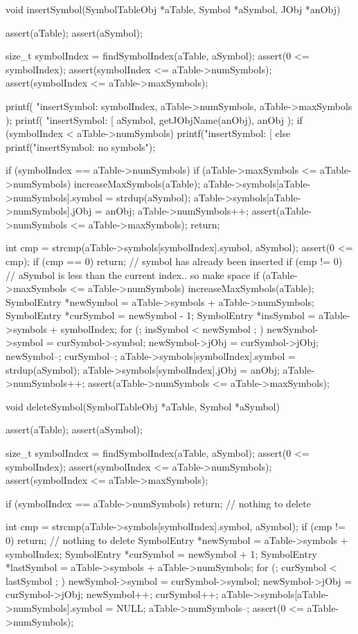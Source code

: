 void insertSymbol(SymbolTableObj *aTable, Symbol *aSymbol, JObj *anObj) {
  assert(aTable);
  assert(aSymbol);
  
  size_t symbolIndex = findSymbolIndex(aTable, aSymbol);
  assert(0 <= symbolIndex);
  assert(symbolIndex <= aTable->numSymbols);
  assert(symbolIndex <= aTable->maxSymbols);
  
  printf(
    "insertSymbol: %
    symbolIndex,
    aTable->numSymbols,
    aTable->maxSymbols
  );
  printf(
    "insertSymbol: [%
    aSymbol,
    getJObjName(anObj),
    anObj
  );
  if (symbolIndex < aTable->numSymbols) {
    printf("insertSymbol: [%
  } else {
    printf("insertSymbol: no symbols\n");
  }
  
  if (symbolIndex == aTable->numSymbols) {
    if (aTable->maxSymbols <= aTable->numSymbols) increaseMaxSymbols(aTable);
    aTable->symbols[aTable->numSymbols].symbol = strdup(aSymbol);
    aTable->symbols[aTable->numSymbols].jObj   = anObj;
    aTable->numSymbols++;
    assert(aTable->numSymbols <= aTable->maxSymbols);
    return;
  }
  
  int cmp = strcmp(aTable->symbols[symbolIndex].symbol, aSymbol);
  assert(0 <= cmp);
  if (cmp == 0) return; // symbol has already been inserted
  if (cmp != 0) { // aSymbol is less than the current index.. so make space
    if (aTable->maxSymbols <= aTable->numSymbols) increaseMaxSymbols(aTable);
    SymbolEntry *newSymbol = aTable->symbols + aTable->numSymbols;
    SymbolEntry *curSymbol = newSymbol - 1;
    SymbolEntry *insSymbol = aTable->symbols + symbolIndex;
    for (; insSymbol < newSymbol ; ) {
      newSymbol->symbol = curSymbol->symbol;
      newSymbol->jObj   = curSymbol->jObj;
      newSymbol--;
      curSymbol--;
    }
  }
  aTable->symbols[symbolIndex].symbol = strdup(aSymbol);
  aTable->symbols[symbolIndex].jObj   = anObj;
  aTable->numSymbols++;
  assert(aTable->numSymbols <= aTable->maxSymbols);
}

void deleteSymbol(SymbolTableObj *aTable, Symbol *aSymbol) {
  assert(aTable);
  assert(aSymbol);
  
  size_t symbolIndex = findSymbolIndex(aTable, aSymbol);
  assert(0 <= symbolIndex);
  assert(symbolIndex <= aTable->numSymbols);
  assert(symbolIndex <= aTable->maxSymbols);

  if (symbolIndex == aTable->numSymbols) return; // nothing to delete
  
  int cmp = strcmp(aTable->symbols[symbolIndex].symbol, aSymbol);
  if (cmp != 0) return; // nothing to delete
  SymbolEntry *newSymbol = aTable->symbols + symbolIndex;
  SymbolEntry *curSymbol = newSymbol + 1;
  SymbolEntry *lastSymbol = aTable->symbols + aTable->numSymbols;
  for (; curSymbol < lastSymbol ; ) {
    newSymbol->symbol = curSymbol->symbol;
    newSymbol->jObj   = curSymbol->jObj;
    newSymbol++;
    curSymbol++;
  }
  aTable->symbols[aTable->numSymbols].symbol = NULL;
  aTable->numSymbols--;
  assert(0 <= aTable->numSymbols);
}

